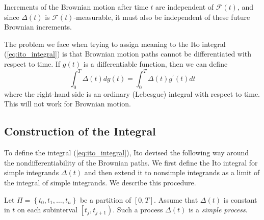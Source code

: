 \documentclass[\topdir/lecture\_notes.tex]{subfiles}
\begin{document}
Increments of the Brownian motion after time \(t\) are independent of \(\mathcal{F}(t)\), and since \(\Delta(t)\) is \(\mathcal{F}(t)\)-measurable, it must also be independent of these future Brownian increments.

The problem we face when trying to assign meaning to the Ito integral (\ref{eq:ito_integral}) is that Brownian motion paths cannot be differentiated with respect to time. If \(g(t)\) is a differentiable function, then we can define
\begin{equation*}
\int_{0}^{T} \Delta(t) dg(t)=\int_{0}^{T} \Delta(t) g^{\prime}(t) dt
\end{equation*}
where the right-hand side is an ordinary (Lebesgue) integral with respect to time. This will not work for Brownian motion.

\subsection{Construction of the Integral}
To define the integral (\ref{eq:ito_integral}), Ito devised the following way around the nondifferentiability of the Brownian paths. We first define the Ito integral for simple integrands \(\Delta(t)\) and then extend it to nonsimple integrands as a limit of the integral of simple integrands. We describe this procedure.

Let \(\Pi=\left\{t_{0}, t_{1}, \ldots, t_{n}\right\}\) be a partition of \([0, T]\). Assume that \(\Delta(t)\) is constant in \(t\) on each subinterval \(\left[t_{j}, t_{j+1}\right)\). Such a process \(\Delta(t)\) is a \emph{simple process}.
\end{document}
